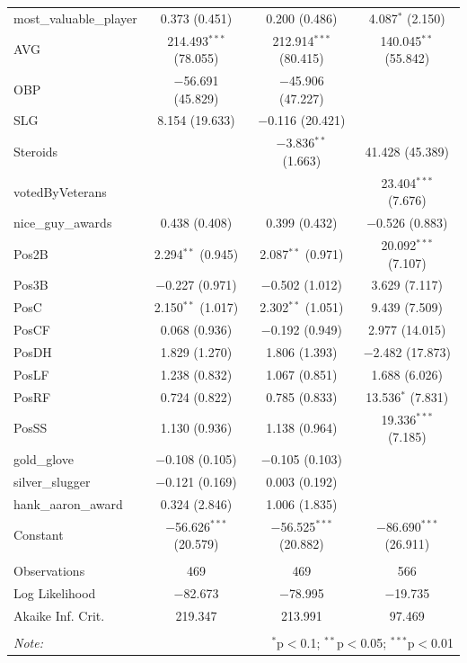 \documentclass[
]{article}
\begin{document}
\begin{table}[H]
\begin{tabular}{@{\extracolsep{5pt}}lccc}
  most\_valuable\_player & 0.373 (0.451) & 0.200 (0.486) & 4.087$^{*}$ (2.150) \\ 
  AVG & 214.493$^{***}$ (78.055) & 212.914$^{***}$ (80.415) & 140.045$^{**}$ (55.842) \\ 
  OBP & $-$56.691 (45.829) & $-$45.906 (47.227) &  \\ 
  SLG & 8.154 (19.633) & $-$0.116 (20.421) &  \\ 
  Steroids &  & $-$3.836$^{**}$ (1.663) & 41.428 (45.389) \\ 
  votedByVeterans &  &  & 23.404$^{***}$ (7.676) \\ 
  nice\_guy\_awards & 0.438 (0.408) & 0.399 (0.432) & $-$0.526 (0.883) \\ 
  Pos2B & 2.294$^{**}$ (0.945) & 2.087$^{**}$ (0.971) & 20.092$^{***}$ (7.107) \\ 
  Pos3B & $-$0.227 (0.971) & $-$0.502 (1.012) & 3.629 (7.117) \\ 
  PosC & 2.150$^{**}$ (1.017) & 2.302$^{**}$ (1.051) & 9.439 (7.509) \\ 
  PosCF & 0.068 (0.936) & $-$0.192 (0.949) & 2.977 (14.015) \\ 
  PosDH & 1.829 (1.270) & 1.806 (1.393) & $-$2.482 (17.873) \\ 
  PosLF & 1.238 (0.832) & 1.067 (0.851) & 1.688 (6.026) \\ 
  PosRF & 0.724 (0.822) & 0.785 (0.833) & 13.536$^{*}$ (7.831) \\ 
  PosSS & 1.130 (0.936) & 1.138 (0.964) & 19.336$^{***}$ (7.185) \\ 
  gold\_glove & $-$0.108 (0.105) & $-$0.105 (0.103) &  \\ 
  silver\_slugger & $-$0.121 (0.169) & 0.003 (0.192) &  \\ 
  hank\_aaron\_award & 0.324 (2.846) & 1.006 (1.835) &  \\ 
  Constant & $-$56.626$^{***}$ (20.579) & $-$56.525$^{***}$ (20.882) & $-$86.690$^{***}$ (26.911) \\ 
 \hline \\[-1.8ex] 
Observations & 469 & 469 & 566 \\ 
Log Likelihood & $-$82.673 & $-$78.995 & $-$19.735 \\ 
Akaike Inf. Crit. & 219.347 & 213.991 & 97.469 \\ 
\hline 
\hline \\[-1.8ex] 
\textit{Note:}  & \multicolumn{3}{r}{$^{*}$p$<$0.1; $^{**}$p$<$0.05; $^{***}$p$<$0.01} \\ 
\end{tabular} 
\end{table}
\end{document}
